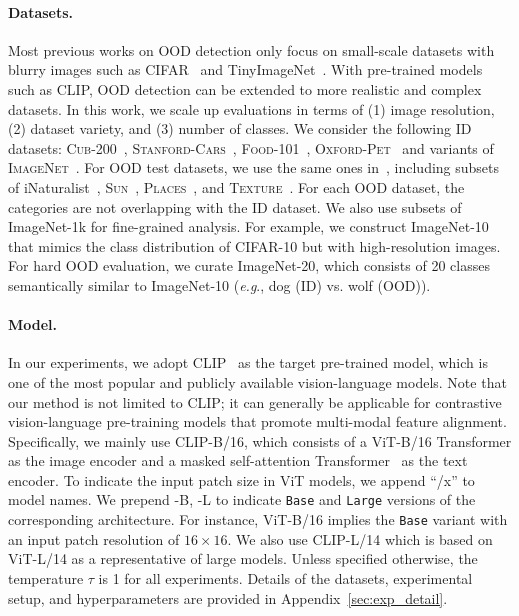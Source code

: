 \documentclass{article}
\def\eg{\emph{e.g}., }
\begin{document}
\paragraph{Datasets.}
Most previous works on OOD detection only focus on small-scale datasets with blurry images such as CIFAR~\cite{krizhevsky2009learning} and TinyImageNet~\cite{le2015tiny}. With
pre-trained
models such as CLIP,
OOD detection can be  extended to more realistic and complex datasets.
In this work, we scale up evaluations in terms of (1) image resolution, (2) dataset variety, and (3) number of classes.  We consider the following ID datasets: \textsc{Cub-200}~\cite{WahCUB_200_2011}, \textsc{Stanford-Cars}~\cite{KrauseStarkDengFei-Fei_3DRR2013}, \textsc{Food-101}~\cite{bossard14},  \textsc{Oxford-Pet}~\cite{parkhi12a} and variants of \textsc{ImageNet}~\cite{deng2009imagenet}. For OOD test datasets, we use the same ones in~\cite{huang2021mos}, including subsets of iNaturalist~\cite{van2018inaturalist}, \textsc{Sun}~\cite{xiao2010sun}, \textsc{Places}~\cite{zhou2017places}, and \textsc{Texture}~\cite{cimpoi2014describing}. For each OOD dataset, the categories are not overlapping with the ID dataset.
We also use subsets of ImageNet-1k for
fine-grained
analysis. For example, we construct ImageNet-10 that mimics the class distribution of CIFAR-10 but with high-resolution images. For hard OOD evaluation, we curate ImageNet-20, which consists of 20 classes semantically similar  to ImageNet-10 (\eg dog (ID) vs. wolf (OOD)). 

\paragraph{Model.} In our experiments, we adopt CLIP~\cite{radford2021learning} as the target pre-trained model, which is one of the most popular and publicly available vision-language models. Note that our method is not limited to CLIP; it can generally be applicable for contrastive vision-language pre-training models that promote multi-modal feature alignment.
Specifically,
we mainly use CLIP-B/16, which consists of a ViT-B/16 Transformer as the image encoder and  a masked self-attention Transformer~\cite{vaswani2017attention} as the text encoder. To indicate the input patch size in ViT models, we append ``/x'' to model names. We prepend -B, -L to indicate \texttt{Base} and \texttt{Large} versions of the corresponding architecture. For instance, ViT-B/16 implies the \texttt{Base} variant with an input patch resolution of $16 \times 16$. We also use CLIP-L/14 which is based on ViT-L/14 as a representative of large models. Unless specified otherwise, the temperature $\tau$ is 1 for all experiments. Details of the datasets, experimental setup, and hyperparameters are provided in Appendix~\ref{sec:exp_detail}.
\end{document}
